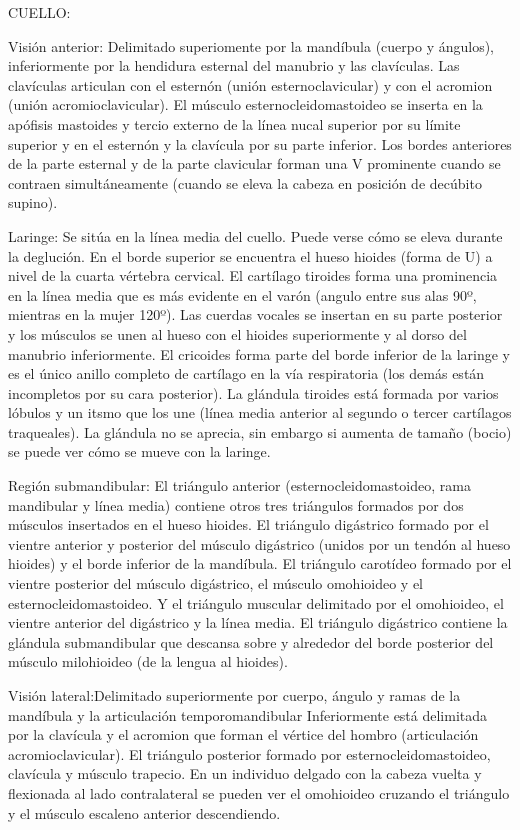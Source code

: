 CUELLO:

Visión anterior: Delimitado superiomente por la mandíbula (cuerpo y ángulos), inferiormente por la hendidura esternal del manubrio y las clavículas. Las clavículas articulan con el esternón (unión esternoclavicular) y con el acromion (unión acromioclavicular).
El músculo esternocleidomastoideo se inserta en la apófisis mastoides y tercio externo de la línea nucal superior por su límite superior y en el esternón y la clavícula por su parte inferior. Los bordes anteriores de la parte esternal y de la parte clavicular forman una V prominente cuando se contraen simultáneamente (cuando se eleva la cabeza en posición de decúbito supino).

Laringe: Se sitúa en la línea media del cuello. Puede verse cómo se eleva durante la deglución. En el borde superior se encuentra el hueso hioides (forma de U) a nivel de la cuarta vértebra cervical. El cartílago tiroides forma una prominencia en la línea media que es más evidente en el varón (angulo entre sus alas 90º, mientras en la mujer 120º). Las cuerdas vocales se insertan en su parte posterior y los músculos se unen al hueso con el hioides superiormente y al dorso del manubrio inferiormente. El cricoides forma parte del borde inferior de la laringe y es el único anillo completo de cartílago en la vía respiratoria (los demás están incompletos por su cara posterior). La glándula tiroides está formada por varios lóbulos y un itsmo que los une (línea media anterior al segundo o tercer cartílagos traqueales). La glándula no se aprecia, sin embargo si aumenta de tamaño (bocio) se puede ver cómo se mueve con la laringe. 

Región submandibular: El triángulo anterior (esternocleidomastoideo, rama mandibular y línea media) contiene otros tres triángulos formados por dos músculos insertados en el hueso hioides. El triángulo digástrico formado por el vientre anterior y posterior del músculo digástrico (unidos por un tendón al hueso hioides) y el borde inferior de la mandíbula. El triángulo carotídeo formado por el vientre posterior del músculo digástrico, el músculo omohioideo y el esternocleidomastoideo. Y el triángulo muscular delimitado por el omohioideo, el vientre anterior del digástrico y la línea media. El triángulo digástrico contiene la glándula submandibular que descansa sobre y alrededor del borde posterior del músculo milohioideo (de la lengua al hioides). 

Visión lateral:Delimitado superiormente por cuerpo, ángulo y ramas de la mandíbula y la articulación temporomandibular Inferiormente está delimitada por la clavícula y el acromion que forman el vértice del hombro (articulación acromioclavicular).
El triángulo posterior formado por esternocleidomastoideo, clavícula y músculo trapecio. En un individuo delgado con la cabeza vuelta y flexionada al lado contralateral se pueden ver el omohioideo cruzando el triángulo y el músculo escaleno anterior descendiendo.

